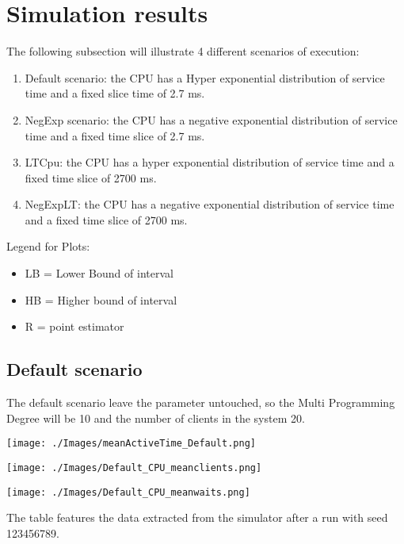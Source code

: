\documentclass[12pt,a4paper]{article}
\begin{document}
\section{Simulation results}
The following subsection will illustrate 4 different scenarios of execution:
\begin{enumerate}
    \item Default scenario: the CPU has a Hyper exponential distribution of service time and a fixed slice time of 2.7 ms.
    \item NegExp scenario: the CPU has a negative exponential distribution of service time and a fixed time slice of 2.7 ms.
    \item LTCpu: the CPU has a hyper exponential distribution of service time and a fixed time slice of 2700 ms.
    \item NegExpLT: the CPU has a negative exponential distribution of service time and a fixed time slice of 2700 ms.
\end{enumerate}
Legend for Plots:
\begin{itemize}
    \item LB = Lower Bound of interval 
    \item HB = Higher bound of interval 
    \item R = point estimator
\end{itemize}

\subsection{Default scenario}
The default scenario leave the parameter untouched, so the Multi Programming Degree will be 10 and the number of clients in the system 20.

\texttt{[image: ./Images/meanActiveTime\_Default.png]}

\texttt{[image: ./Images/Default\_CPU\_meanclients.png]}

\texttt{[image: ./Images/Default\_CPU\_meanwaits.png]}

The table features the data extracted from the simulator after a run with seed 123456789.
\end{document}
